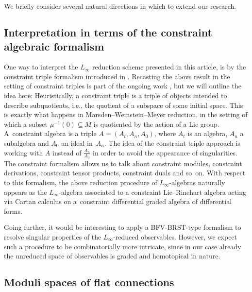 \documentclass[10pt,a4paper]{amsart}
\numberwithin{equation}{section}
\renewcommand{\subset}{\subseteq}
\begin{document}
We briefly consider several natural directions in which to extend our research.

\subsection{Interpretation in terms of the constraint algebraic formalism}

One way to interpret the $L_\infty$ reduction scheme presented in this article, is by the constraint triple formalism introduced
in \cite{DippelEspositoWaldmann2019}. Recasting the above result in the setting of constraint triples is part of the ongoing work \cite{ongoing}, but we will outline the idea here: Heuristically, a constraint triple is a triple of objects intended to describe subquotients, i.e., the quotient of a subspace of some initial space. This is exactly what happens in Marsden--Weinstein--Meyer reduction, in the setting of which a subset $\mu^{-1}(0)\subset M$ is quotiented by the action of a Lie group. A~constraint algebra is a triple $A = (A_t , A_n , A_0)$, where $A_t$ is
an algebra, $A_n$ a subalgebra and $A_0$ an ideal in~$A_n$.  The idea of the constraint triple
approach is working with $A$ instead of $\frac{A_n}{A_0}$ in order to avoid the appearance of singularities.
The constraint formalism allows us to talk about constraint modules, constraint derivations,
constraint tensor products, constraint duals and so~on. With respect to this formalism, the
above reduction procedure of $L_\infty$-algebras naturally appears as the $L_\infty$-algebra associated
to a constraint Lie--Rinehart algebra acting via Cartan calculus on a~constraint differential
graded algebra of differential forms.

Going further, it would be interesting to apply a BFV-BRST-type formalism to resolve singular properties of the $L_\infty$-reduced observables. However, we expect such a procedure to be combinatorially more intricate, since in our case already the unreduced space of observables is graded and homotopical in nature.

\subsection{Moduli spaces of flat connections}%
\end{document}
